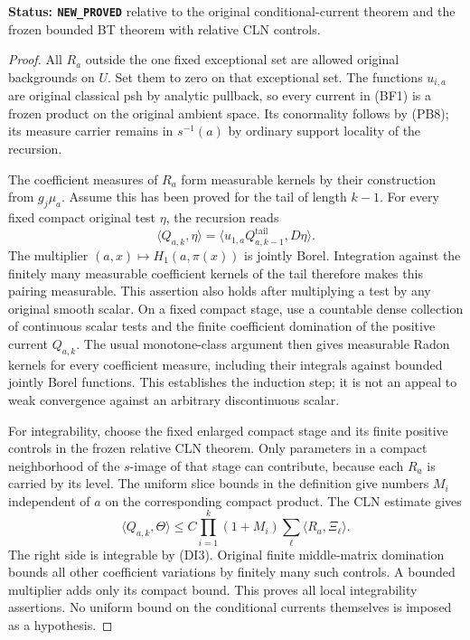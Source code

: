 \documentclass[11pt,a4paper]{article}
\numberwithin{equation}{section}
\theoremstyle{definition}
\theoremstyle{remark}
\begin{document}
\noindent\textbf{Status: \texttt{NEW\_PROVED}} relative to the
original conditional-current theorem and the frozen bounded BT
theorem with relative CLN controls.

\begin{proof}
All $R_a$ outside the one fixed exceptional set are allowed original
backgrounds on $U$. Set them to zero on that exceptional set. The
functions $u_{i,a}$ are original classical psh by analytic pullback,
so every current in (BF1) is a frozen product on the original
ambient space. Its conormality follows by (PB8); its measure carrier
remains in $s^{-1}(a)$ by ordinary support locality of the recursion.

The coefficient measures of $R_a$ form measurable kernels by their
construction from $g_j\mu_a$. Assume this has been proved for the
tail of length $k-1$. For every fixed compact original test $\eta$,
the recursion reads
\[
                \langle Q_{a,k},\eta\rangle
                  =\langle u_{1,a}Q_{a,k-1}^{\mathrm{tail}},D\eta\rangle.
 \tag{BF2}
\]
The multiplier $(a,x)\mapsto H_1(a,\pi(x))$ is jointly Borel.
Integration against the finitely many measurable coefficient kernels
of the tail therefore makes this pairing measurable. This assertion
also holds after multiplying a test by any original smooth scalar.
On a fixed compact stage, use a countable dense collection of
continuous scalar tests and the finite coefficient domination of
the positive current $Q_{a,k}$. The usual monotone-class argument
then gives measurable Radon kernels for every coefficient measure,
including their integrals against bounded jointly Borel functions.
This establishes the induction step; it is not an appeal to weak
convergence against an arbitrary discontinuous scalar.

For integrability, choose the fixed enlarged compact stage and its
finite positive controls in the frozen relative CLN theorem. Only
parameters in a compact neighborhood of the $s$-image of that stage
can contribute, because each $R_a$ is carried by its level. The
uniform slice bounds in the definition give numbers $M_i$ independent
of $a$ on the corresponding compact product. The CLN estimate gives
\[
 \langle Q_{a,k},\Theta\rangle
       \le C\prod_{i=1}^k(1+M_i)
                                      \sum_\ell\langle R_a,\Xi_\ell\rangle.
 \tag{BF3}
\]
The right side is integrable by (DI3). Original finite middle-matrix
domination bounds all other coefficient variations by finitely many
such controls. A bounded multiplier adds only its compact bound.
This proves all local integrability assertions. No uniform bound
on the conditional currents themselves is imposed as a hypothesis.
\end{proof}
\end{document}
